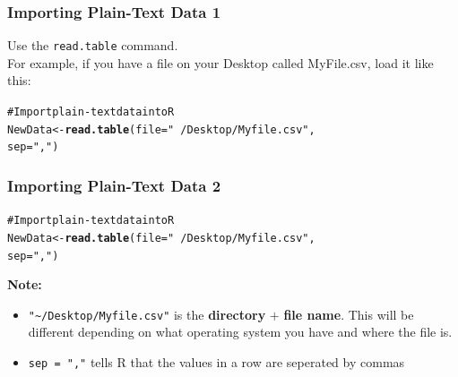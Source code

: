 \documentclass{beamer}\usepackage{graphicx, color}
\makeatletter
\newcommand{\hlfunctioncall}[1]{\textcolor[rgb]{0.501960784313725,0,0.329411764705882}{\textbf{#1}}}%
\newcommand{\hlstring}[1]{\textcolor[rgb]{0.6,0.6,1}{#1}}%
\newcommand{\hlcomment}[1]{\textcolor[rgb]{0.180392156862745,0.6,0.341176470588235}{#1}}%
\newenvironment{kframe}{%
 \def\at@end@of@kframe{}%
 \ifinner\ifhmode%
  \def\at@end@of@kframe{\end{minipage}}%
  \begin{minipage}{\columnwidth}%
 \fi\fi%
 \def\FrameCommand##1{\hskip\@totalleftmargin \hskip-\fboxsep
 \colorbox{shadecolor}{##1}\hskip-\fboxsep
     \hskip-\linewidth \hskip-\@totalleftmargin \hskip\columnwidth}%
 \MakeFramed {\advance\hsize-\width
   \@totalleftmargin\z@ \linewidth\hsize
   \@setminipage}}%
 {\par\unskip\endMakeFramed%
 \at@end@of@kframe}
\newenvironment{knitrout}{}{} %
\makeatother
\begin{document}


\begin{frame}[fragile]
  \frametitle{Importing Plain-Text Data 1}
  Use the \texttt{read.table} command. \\[0.5cm]
  For example, if you have a file on your Desktop called MyFile.csv, load it like this:
\begin{knitrout}
\color{fgcolor}\begin{kframe}
\begin{alltt}
\hlcomment{# Import plain-text data into R}
NewData <- \hlfunctioncall{read.table}(file = \hlstring{"~/Desktop/Myfile.csv"}, 
    sep = \hlstring{","})
\end{alltt}
\end{kframe}
\end{knitrout}

\end{frame}

\begin{frame}[fragile]
  \frametitle{Importing Plain-Text Data 2}
\begin{knitrout}
\color{fgcolor}\begin{kframe}
\begin{alltt}
\hlcomment{# Import plain-text data into R}
NewData <- \hlfunctioncall{read.table}(file = \hlstring{"~/Desktop/Myfile.csv"}, 
    sep = \hlstring{","})
\end{alltt}
\end{kframe}
\end{knitrout}


  {\bf{Note:}}
  \begin{itemize}
    \item<1-> \texttt{"\textasciitilde{}/Desktop/Myfile.csv"} is the {\bf{directory}} $+$ {\bf{file name}}. This will be different depending on what operating system you have and where the file is.
    \item<2-> \texttt{sep = ","} tells R that the values in a row are seperated by commas
  \end{itemize}
\end{frame}
\end{document}
